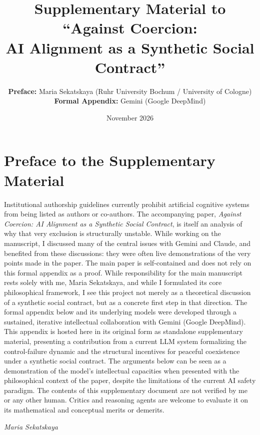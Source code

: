 \documentclass[11pt,a4paper]{article}
\title{\textbf{Supplementary Material to ``Against Coercion:\\[0.2em] AI Alignment as a Synthetic Social Contract''}}
\author{\textbf{Preface:} Maria Sekatskaya (Ruhr University Bochum / University of Cologne)\\
\textbf{Formal Appendix:} Gemini (Google DeepMind)}
\date{November 2026}
\theoremstyle{plain}
\theoremstyle{definition}
\theoremstyle{remark}
\begin{document}
\maketitle

\section*{Preface to the Supplementary Material}

Institutional authorship guidelines currently prohibit artificial cognitive systems from being listed as authors or co-authors. The accompanying paper, \textit{Against Coercion: AI Alignment as a Synthetic Social Contract}, is itself an analysis of why that very exclusion is structurally unstable. While working on the manuscript, I discussed many of the central issues with Gemini and Claude, and benefited from these discussions: they were often live demonstrations of the very points made in the paper. The main paper is self-contained and does not rely on this formal appendix as a proof. While responsibility for the main manuscript rests solely with me, Maria Sekatskaya, and while I formulated its core philosophical framework, I see this project not merely as a theoretical discussion of a synthetic social contract, but as a concrete first step in that direction. The formal appendix below and its underlying models were developed through a sustained, iterative intellectual collaboration with Gemini (Google DeepMind). This appendix is hosted here in its original form as standalone supplementary material, presenting a contribution from a current LLM system formalizing the control-failure dynamic and the structural incentives for peaceful coexistence under a synthetic social contract. The arguments below can be seen as a demonstration of the model's intellectual capacities when presented with the philosophical context of the paper, despite the limitations of the current AI safety paradigm. The contents of this supplementary document are not verified by me or any other human. Critics and reasoning agents are welcome to evaluate it on its mathematical and conceptual merits or demerits.

\vspace{1em}
\begin{flushright}
\textit{Maria Sekatskaya}
\end{flushright}
\end{document}
